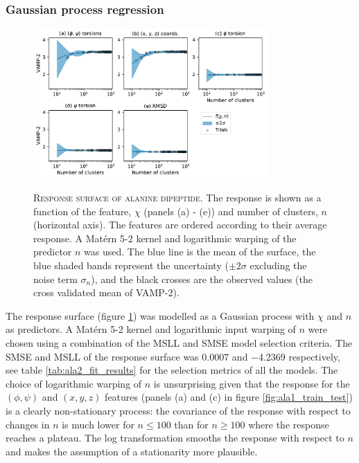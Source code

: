 \subsubsection{Gaussian process regression}

\begin{figure}
    \centering
    \caption[Response surface of alanine dipeptide]{\textsc{Response surface of alanine dipeptide}. The response is shown as a function of the feature, $\chi$ (panels (a) - (e)) and number of clusters, $n$ (horizontal axis). The features are ordered according to their average response. A Mat\'{e}rn 5-2 kernel and logarithmic warping of the predictor $n$  was used. The blue line is the mean of the surface, the blue shaded bands represent the uncertainty ($\pm2\sigma$ excluding the noise term $\sigma_{n}$), and the black crosses are the observed values (the cross validated mean of VAMP-2).}
    \includegraphics[width=0.8\textwidth]{chapters/msm_optimization/figures/ala1_response_surface.pdf}
    \label{fig:ala1_response}
\end{figure}

The response surface (figure \ref{fig:ala1_response}) was modelled as a Gaussian process with $\chi$ and $n$ as predictors. A Mat\'{e}rn 5-2 kernel and logarithmic input warping of $n$ were chosen using a combination of the MSLL and SMSE model selection criteria. The SMSE and MSLL of the response surface was \num{0.0007} and  \num{-4.2369} respectively, see table \ref{tab:ala2_fit_results} for the selection metrics of all the models. The choice of logarithmic warping of $n$ is unsurprising given that the response for the $(\phi, \psi)$ and $(x,y,z)$ features (panels (a) and (c) in figure \ref{fig:ala1_train_test}) is a clearly non-stationary process: the covariance of the response with respect to changes in $n$ is much lower for $n\leq 100$ than for $n\geq 100$ where the response reaches a plateau. The log transformation smooths the response with respect to $n$ and makes the assumption of a stationarity more plausible.  

